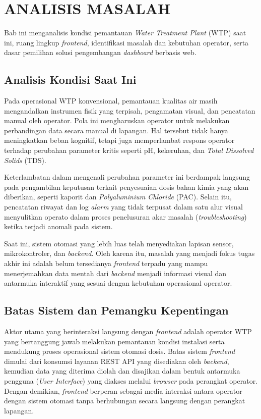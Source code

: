 \cleardoublepage
\chapter{ANALISIS MASALAH}
\label{chap:analisis-masalah}

Bab ini menganalisis kondisi pemantauan \textit{Water Treatment Plant} (WTP) saat ini, 
ruang lingkup \textit{frontend}, identifikasi masalah dan kebutuhan operator, 
serta dasar pemilihan solusi pengembangan \textit{dashboard} berbasis web.

\section{Analisis Kondisi Saat Ini}
Pada operasional WTP konvensional, pemantauan kualitas air masih mengandalkan 
instrumen fisik yang terpisah, pengamatan visual, dan pencatatan manual oleh operator. 
Pola ini mengharuskan operator untuk melakukan perbandingan data secara manual 
di lapangan. Hal tersebut tidak hanya meningkatkan beban kognitif, tetapi juga 
memperlambat respons operator terhadap perubahan parameter kritis seperti pH, kekeruhan, 
dan \textit{Total Dissolved Solids} (TDS). 

Keterlambatan dalam mengenali perubahan parameter ini berdampak langsung pada 
pengambilan keputusan terkait penyesuaian dosis bahan kimia yang akan diberikan, seperti 
kaporit dan \textit{Polyaluminium Chloride} (PAC). Selain itu, pencatatan riwayat 
dan log \textit{alarm} yang tidak terpusat dalam satu alur visual menyulitkan operato dalam proses 
penelusuran akar masalah (\textit{troubleshooting}) ketika terjadi anomali pada sistem. 

Saat ini, sistem otomasi yang lebih luas telah menyediakan lapisan sensor, mikrokontroler, 
dan \textit{backend}. Oleh karena itu, masalah yang menjadi fokus tugas akhir ini adalah 
belum tersedianya \textit{frontend} terpadu yang mampu menerjemahkan data mentah dari 
\textit{backend} menjadi informasi visual dan antarmuka interaktif yang sesuai dengan 
kebutuhan operasional operator.

\section{Batas Sistem dan Pemangku Kepentingan}

Aktor utama yang berinteraksi langsung dengan \textit{frontend} adalah operator WTP
yang bertanggung jawab melakukan pemantauan kondisi instalasi serta mendukung
proses operasional sistem otomasi dosis. Batas sistem \textit{frontend} dimulai dari
konsumsi layanan REST API yang disediakan oleh \textit{backend}, kemudian data yang
diterima diolah dan disajikan dalam bentuk antarmuka pengguna (\textit{User Interface})
yang diakses melalui \textit{browser} pada perangkat operator. Dengan demikian,
\textit{frontend} berperan sebagai media interaksi antara operator dengan sistem
otomasi tanpa berhubungan secara langsung dengan perangkat lapangan.


